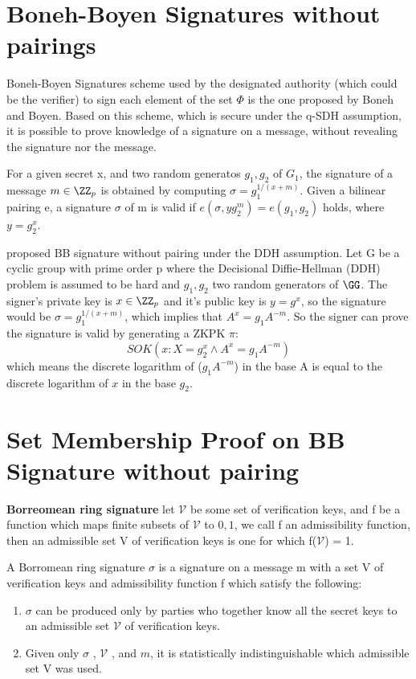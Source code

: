 \section{Boneh-Boyen Signatures without pairings}
\label{appendix: bbs-no-pairing}
Boneh-Boyen Signatures scheme \cite{jao2009boneh} used by the designated authority
(which could be the verifier) to sign each element of the set $\Phi$ is the one proposed by Boneh and Boyen.
Based on this scheme, which is secure under the q-SDH assumption, it is possible to prove knowledge of a
signature on a message, without revealing the signature nor the message.

For a given secret x, and two random generatos $g_1, g_2$ of $G_1$, the signature of a message $m \in \ZZ_p$ is obtained by computing $\sigma = g_1^{1/(x+m)}$. Given a bilinear pairing e, a signature $\sigma$ of m is valid if $e(\sigma, yg_2^m) = e(g_1, g_2)$ holds, where $y = g_2^x$.

\cite{arfaoui2015practical} proposed BB signature without pairing under the DDH assumption. Let G be a cyclic group with prime order p where the
Decisional Diffie-Hellman (DDH) problem is assumed to be hard and $g_1, g_2$ two random generators of $\GG$. The signer’s private key is $x \in \ZZ_p$ and it's public key is $y = g^x$, so the signature would be $\sigma = g_1^{1/(x+m)}$, which implies that $A^x = g_1 A^{-m}$. So the signer can prove the signature is valid by generating a ZKPK $\pi$:
\begin{equation}
    SOK(x: X = g_2^x \land A^x = g_1A^{-m})
\end{equation}
which means the discrete logarithm of ($g_1 A^{-m}$) in the base A is equal to the discrete logarithm of $x$ in the base $g_2$.

\section{Set Membership Proof on BB Signature without pairing}

\begin{myDef}
\label{d5}
\textbf{Borreomean ring signature\cite{maxwell2015borromean}} let $\mathcal{V}$ be some set of verification keys, and f be a function which maps finite subsets of $\mathcal{V}$ to ${0, 1}$, we call f an admissibility function, then an admissible set V of verification keys is one for which f($\mathcal{V}$) = 1. 

A Borromean ring signature $\sigma$ is a signature on a message m with a set V of verification keys and admissibility function f which satisfy the following:
\begin{enumerate}
    \item $\sigma$ can be produced only by parties who together know all the secret keys to an admissible set $\mathcal{V}$ of verification keys.
    \item Given only $\sigma$ , $\mathcal{V}$ , and $m$, it is statistically indistinguishable which admissible set V was used.
\end{enumerate}
\end{myDef}

